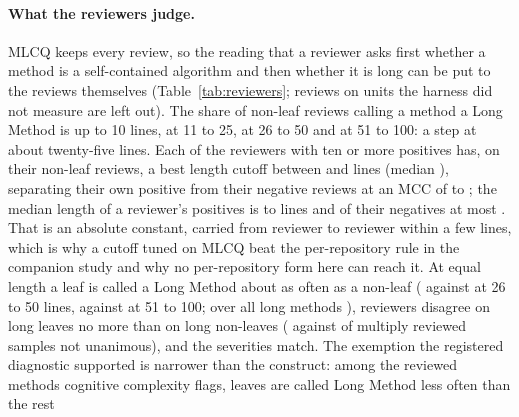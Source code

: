 \documentclass[11pt,a4paper]{article}
\newcommand{\fitwidth}[1]{\resizebox{\ifdim\width>\textwidth\textwidth\else\width\fi}{!}{#1}}
\begin{document}
\begin{table}[t]
\centering
\caption{Exploratory, post hoc: MLCQ's individual Long Method reviews on
measured units (\revLongReviews{} reviews by \revReviewers{} reviewers,
both halves), by the method's length and whether it is a leaf (no internal
call): the share of reviews that call the method a Long Method at any
severity.}
\label{tab:reviewers}
\small
\setlength{\tabcolsep}{4pt}
\fitwidth{}
\end{table}

\paragraph{What the reviewers judge.} MLCQ keeps every review, so the
reading that a reviewer asks first whether a method is a self-contained
algorithm and then whether it is long can be put to the reviews themselves
(Table~\ref{tab:reviewers}; \revLongUnmapped{} reviews on units the harness
did not measure are left out). The share of non-leaf reviews calling a
method a Long Method is \revNonLeafTenRate{} up to 10 lines,
\revNonLeafTwentyFiveRate{} at 11 to 25, \revNonLeafFiftyRate{} at 26 to 50
and \revNonLeafHundredRate{} at 51 to 100: a step at about twenty-five
lines. Each of the \revCutoffReviewers{} reviewers with ten or more
positives has, on their non-leaf reviews, a best length cutoff between
\revCutoffMin{} and \revCutoffMax{} lines (median \revCutoffMedian{}),
separating their own positive from their negative reviews at an MCC of \revCutoffMccMin{} to
\revCutoffMccMax{}; the median length of a reviewer's positives is
\revPosMedianMin{} to \revPosMedianMax{} lines and of their negatives at
most \revNegMedianMax{}. That is an absolute constant, carried from
reviewer to reviewer within a few lines, which is why a cutoff tuned on
MLCQ beat the per-repository rule in the companion study and why no
per-repository form here can reach it. At equal length a leaf is called a
Long Method about as often as a non-leaf (\revLeafFiftyRate{} against
\revNonLeafFiftyRate{} at 26 to 50 lines, \revLeafHundredRate{} against
\revNonLeafHundredRate{} at 51 to 100; over all long methods
\revLongLeafMinusNonLeaf{}), reviewers disagree on long leaves no more than
on long non-leaves (\revDisagreeLongLeaf{} against
\revDisagreeLongNonLeaf{} of multiply reviewed samples not unanimous), and
the severities match. The exemption the registered diagnostic supported is
narrower than the construct: among the reviewed methods cognitive
complexity flags, leaves are called Long Method less often than the rest
\end{document}
